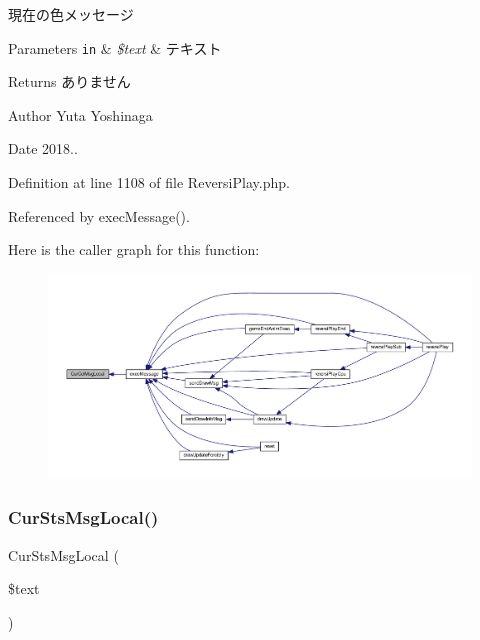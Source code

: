 現在の色メッセージ 


\begin{DoxyParams}[1]{Parameters}
\mbox{\tt in}  & {\em \$text} & テキスト \\
\hline
\end{DoxyParams}
\begin{DoxyReturn}{Returns}
ありません 
\end{DoxyReturn}
\begin{DoxyAuthor}{Author}
Yuta Yoshinaga 
\end{DoxyAuthor}
\begin{DoxyDate}{Date}
2018.. 
\end{DoxyDate}


Definition at line 1108 of file Reversi\+Play.\+php.



Referenced by exec\+Message().

Here is the caller graph for this function\+:\nopagebreak
\begin{figure}[H]
\begin{center}
\leavevmode
\includegraphics[width=350pt]{class_reversi_play_aa217a221907e90c97719f8332c60a6d6_icgraph}
\end{center}
\end{figure}
\mbox{\label{class_reversi_play_ae3da8fb1a3a365c6e5254e5cf6f1e7bc}} 
\subsubsection{\texorpdfstring{Cur\+Sts\+Msg\+Local()}{CurStsMsgLocal()}}
{\footnotesize\ttfamily Cur\+Sts\+Msg\+Local (\begin{DoxyParamCaption}\item[{}]{\$text }\end{DoxyParamCaption})\hspace{0.3cm}{\ttfamily [private]}}




